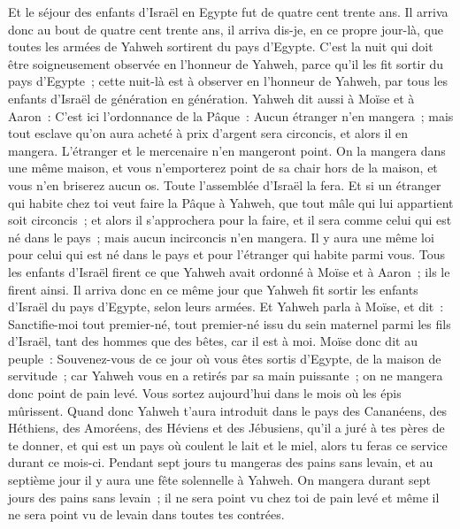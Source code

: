 \begin{multicols}{2}
Et le séjour des enfants d'Israël en Egypte fut de quatre cent trente ans.
Il arriva donc au bout de quatre cent trente ans, il arriva dis-je, en ce propre jour-là, que toutes les armées de Yahweh sortirent du pays d'Egypte.
C'est la nuit qui doit être soigneusement observée en l'honneur de Yahweh, parce qu'il les fit sortir du pays d'Egypte~; cette nuit-là est à observer en l'honneur de Yahweh, par tous les enfants d'Israël de génération en génération.
Yahweh dit aussi à Moïse et à Aaron~: C'est ici l'ordonnance de la Pâque~: Aucun étranger n'en mangera~;
mais tout esclave qu'on aura acheté à prix d'argent sera circoncis, et alors il en mangera.
L'étranger et le mercenaire n'en mangeront point.
On la mangera dans une même maison, et vous n'emporterez point de sa chair hors de la maison, et vous n'en briserez aucun os.
Toute l'assemblée d'Israël la fera.
Et si un étranger qui habite chez toi veut faire la Pâque à Yahweh, que tout mâle qui lui appartient soit circoncis~; et alors il s'approchera pour la faire, et il sera comme celui qui est né dans le pays~; mais aucun incirconcis n'en mangera.
Il y aura une même loi pour celui qui est né dans le pays et pour l'étranger qui habite parmi vous.
Tous les enfants d'Israël firent ce que Yahweh avait ordonné à Moïse et à Aaron~; ils le firent ainsi.
Il arriva donc en ce même jour que Yahweh fit sortir les enfants d'Israël du pays d'Egypte, selon leurs armées.
\VerseOne{}Et Yahweh parla à Moïse, et dit~:
Sanctifie-moi tout premier-né, tout premier-né issu du sein maternel parmi les fils d'Israël, tant des hommes que des bêtes, car il est à moi.
Moïse donc dit au peuple~: Souvenez-vous de ce jour où vous êtes sortis d'Egypte, de la maison de servitude~; car Yahweh vous en a retirés par sa main puissante~; on ne mangera donc point de pain levé.
Vous sortez aujourd'hui dans le mois où les épis mûrissent.
Quand donc Yahweh t'aura introduit dans le pays des Cananéens, des Héthiens, des Amoréens, des Héviens et des Jébusiens, qu'il a juré à tes pères de te donner, et qui est un pays où coulent le lait et le miel, alors tu feras ce service durant ce mois-ci.
Pendant sept jours tu mangeras des pains sans levain, et au septième jour il y aura une fête solennelle à Yahweh.
On mangera durant sept jours des pains sans levain~; il ne sera point vu chez toi de pain levé et même il ne sera point vu de levain dans toutes tes contrées.

\end{multicols}
